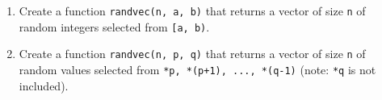   \begin{enumerate}[nosep]
  \item
    Create a function \verb!randvec(n, a, b)!
    that returns a vector of size \verb!n!
    of random integers selected from \verb![a, b)!.
  \item
    Create a function \verb!randvec(n, p, q)!
    that returns a vector of size \verb!n!
    of random values selected from \verb!*p, *(p+1), ..., *(q-1)! (note:
    \verb!*q! is not included).
  \end{enumerate}
